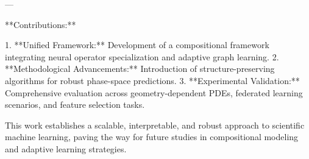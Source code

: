 ---

**Contributions:**  

1. **Unified Framework:** Development of a compositional framework integrating neural operator specialization and adaptive graph learning.  
2. **Methodological Advancements:** Introduction of structure-preserving algorithms for robust phase-space predictions.  
3. **Experimental Validation:** Comprehensive evaluation across geometry-dependent PDEs, federated learning scenarios, and feature selection tasks.  

This work establishes a scalable, interpretable, and robust approach to scientific machine learning, paving the way for future studies in compositional modeling and adaptive learning strategies.